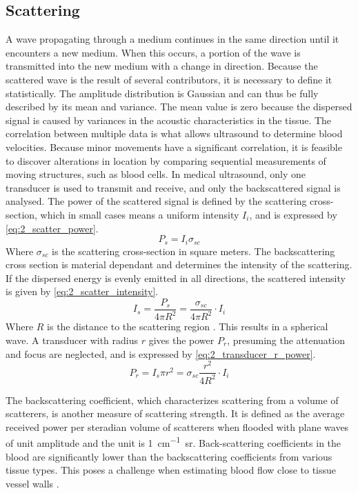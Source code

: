 \subsection{Scattering}
A wave propagating through a medium continues in the same direction until it encounters a new medium. When this occurs, a portion of the wave is transmitted into the new medium with a change in direction. Because the scattered wave is the result of several contributors, it is necessary to define it statistically. The amplitude distribution is Gaussian \cite{JensenUltrasoundBook} and can thus be fully described by its mean and variance. The mean value is zero because the dispersed signal is caused by variances in the acoustic characteristics in the tissue. The correlation between multiple data is what allows ultrasound to determine blood velocities. Because minor movements have a significant correlation, it is feasible to discover alterations in location by comparing sequential measurements of moving structures, such as blood cells. In medical ultrasound, only one transducer is used to transmit and receive, and only the backscattered signal is analysed. The power of the scattered signal is defined by the scattering cross-section, which in small cases means a uniform intensity $I_{i}$, and is expressed by \cref{eq:2_scatter_power}.
\begin{equation} \label{eq:2_scatter_power}
	P_{s} = I_{i} \sigma_{s c}
\end{equation}
Where $\sigma_{s c}$ is the scattering cross-section in square meters. The backscattering cross section is material dependant and determines the intensity of the scattering. If the dispersed energy is evenly emitted in all directions, the scattered intensity is given by \cref {eq:2_scatter_intensity}.
\begin{equation} \label{eq:2_scatter_intensity}
	I_{s} = \frac{P_{s}}{4 \pi R^{2}} = \frac{\sigma_{sc}}{4 \pi R^{2}} \cdot I_{i}
\end{equation}
Where $R$ is the distance to the scattering region \cite{JensenUltrasoundBook}. This results in a spherical wave. A transducer with radius $r$ gives the power $P_{r}$, presuming the attenuation and focus are neglected, and is expressed by \cref{eq:2_transducer_r_power}.
\begin{equation} \label{eq:2_transducer_r_power}
	P_{r} = I_{s} \pi r^{2} = \sigma_{s c} \frac{r^{2}}{4 R^{2}} \cdot I_{i}
\end{equation}

The backscattering coefficient, which characterizes scattering from a volume of scatterers, is another measure of scattering strength. It is defined as the average received power per steradian volume of scatterers when flooded with plane waves of unit amplitude and the unit is \unit{1\per\centi\meter\steradian}. Back-scattering coefficients in the blood are significantly lower than the backscattering coefficients from various tissue types. This poses a challenge when estimating blood flow close to tissue vessel walls \cite{ShungScattering1992,JensenUltrasoundBook}.

